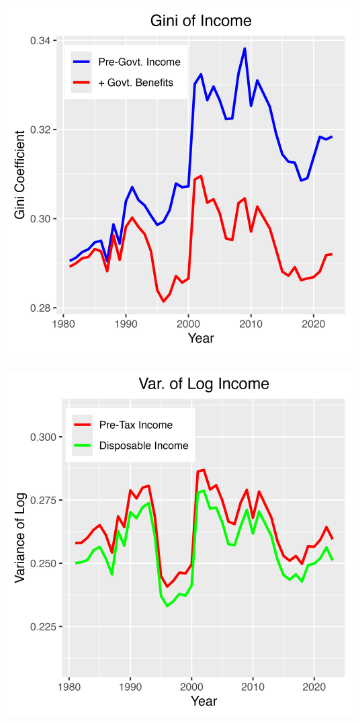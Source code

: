 \documentclass{article}
\begin{document}
\begin{figure}[t]
\begin{subfigure}[t]{0.475\textwidth}
        \includegraphics[width=\textwidth]{figures/Fig_5/Fig_5b_Gini_inc.png}
    \end{subfigure}
    \begin{subfigure}[t]{0.475\textwidth}
        \centering
        \includegraphics[width=\textwidth]{figures/Fig_5/Fig_5c_Var_inc.png}

\end{subfigure}
\end{figure}
\end{document}
